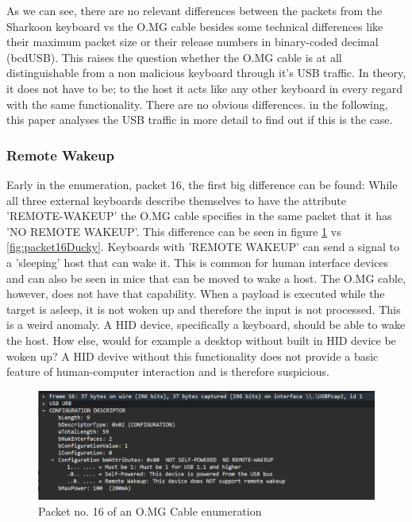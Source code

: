 As we can see, there are no relevant differences between the packets from the Sharkoon keyboard vs the O.MG cable besides some technical differences like their maximum packet size or their release numbers in binary-coded decimal (bcdUSB). This raises the question whether the O.MG cable is at all distinguishable
from a non malicious keyboard through it's USB traffic. In theory, it does not have to be; to the host it acts like any other keyboard in every regard with the same functionality. There are no obvious differences. in the following, this paper analyses the USB traffic in more detail to find out if this is the case.


\subsubsection{Remote Wakeup}

Early in the enumeration, packet 16, the first big difference can be found: While all three external keyboards describe themselves to have the attribute 'REMOTE-WAKEUP' the O.MG cable specifies in the same packet that it has 'NO REMOTE WAKEUP'. This difference can be seen in figure \ref{fig:packet16OMG} vs \ref{fig:packet16Ducky}. Keyboards with 'REMOTE WAKEUP' can send a signal to a 'sleeping' host that can wake it. This is common for human interface devices and can also be seen in mice that can be moved to wake a host. The O.MG cable, however, does not have that capability. When a payload is executed while the target is asleep, it is not woken up and therefore the input is not processed. This is a weird anomaly. A HID device, specifically a keyboard, should be able to wake the host. How else, would for example a desktop without built in HID device be woken up? A HID devive without this functionality does not provide a basic feature of human-computer interaction and is therefore suspicious.

\begin{figure}[H]
    \centering
    \includegraphics[width=0.75\linewidth]{visuals/no-remote-wakeup-100mA.png}
    \caption{Packet no. 16 of an O.MG Cable enumeration}
    \label{fig:packet16OMG}
\end{figure}

